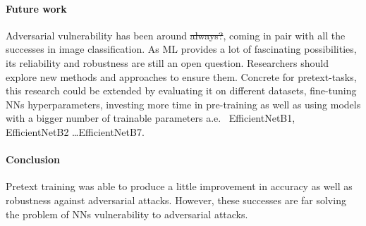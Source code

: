 \paragraph{Future work}
Adversarial vulnerability has been around \st{always?}, coming in pair with all the successes in image classification.
As ML provides a lot of fascinating possibilities, its reliability and robustness are still an open question.
Researchers should explore new methods and approaches to ensure them.
Concrete for pretext-tasks, this research could be extended by evaluating it on different datasets, fine-tuning NNs
hyperparameters, investing more time in pre-training as well as using models with a bigger number of trainable parameters
a.e. \ EfficientNetB1, EfficientNetB2 \ldots EfficientNetB7.

\paragraph{Conclusion}
Pretext training was able to produce a little improvement in accuracy as well as robustness against adversarial attacks.
However, these successes are far solving the problem of NNs vulnerability to adversarial attacks.

